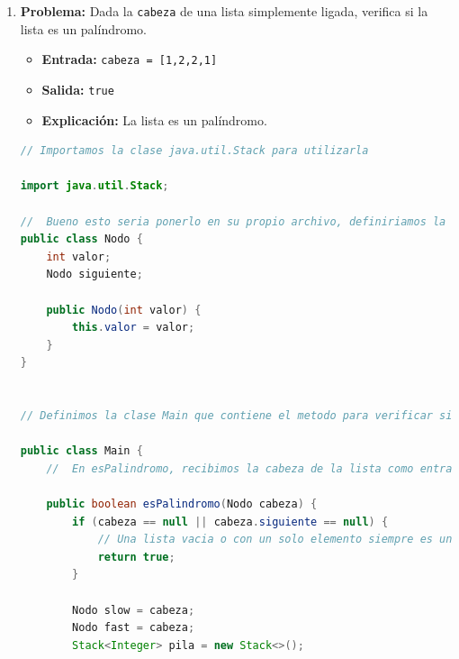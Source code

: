 \documentclass{article}
\begin{document}
\begin{enumerate}
\begin{lstlisting}[language=Java]
    public static void main(String[] args) {
        Main main = new Main();
        String s = "Hola Mundo";
        int longitud = main.longitudUltimaPalabra(s);
    }
}

// En el metodo 'main', creamos una instancia de la clase 'Main' para llamar a 'longitudUltimaPalabra'.
// Luego, definimos la cadena 's' que contiene "Hola Mundo".
// Llamamos al metodo 'longitudUltimaPalabra' en 'Main' para obtener la longitud de la ultima palabra en la cadena 's'.
// Y ya para terminar se imprimie el resultado usando 'System.out.println()' para mostrar la longitud de la ultima palabra. Imprime "La longitud de la ultima palabra en la cadena es: 5", siendo esta pues la palabra mundo.

    \end{lstlisting}
    \item \textbf{Problema:} Dada la \texttt{cabeza} de una lista simplemente
    ligada, verifica si la lista es un palíndromo.
    \begin{itemize}
        \item \textbf{Entrada:} \texttt{cabeza = [1,2,2,1]}
        \item \textbf{Salida:} \texttt{true}
        \item \textbf{Explicación:} La lista es un palíndromo.
    \end{itemize}
    \begin{lstlisting}[language=Java]
       // Importamos la clase java.util.Stack para utilizarla

import java.util.Stack;

//  Bueno esto seria ponerlo en su propio archivo, definiriamos la clase Nodo que representa un nodo de la lista simplemente ligada.
public class Nodo {
    int valor;
    Nodo siguiente;

    public Nodo(int valor) {
        this.valor = valor;
    }
}


// Definimos la clase Main que contiene el metodo para verificar si la lista es un palindromo.

public class Main {
    //  En esPalindromo, recibimos la cabeza de la lista como entrada y verificamos si si es.
    
    public boolean esPalindromo(Nodo cabeza) {
        if (cabeza == null || cabeza.siguiente == null) {
            // Una lista vacia o con un solo elemento siempre es un palindromo.
            return true;
        }

        Nodo slow = cabeza;
        Nodo fast = cabeza;
        Stack<Integer> pila = new Stack<>();


\end{lstlisting}
\end{enumerate}
\end{document}
